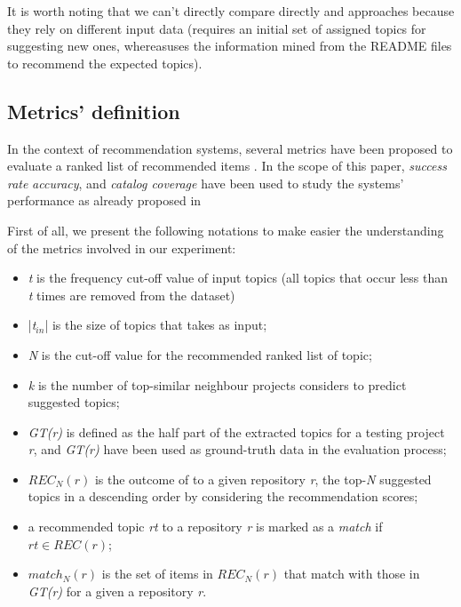It is worth noting that we can't directly compare directly \TF and \MNB approaches because they rely on different input data (\ie \TF requires an initial set of assigned topics for suggesting new ones, whereas\MNB uses the information mined from the README files to recommend the expected topics). 


\subsection{Metrics' definition}\label{sec:metrics}

In the context of recommendation systems, several metrics have been proposed to evaluate a ranked list of recommended items \cite{DBLP:conf/rweb/NoiaO15}. In the scope of this paper, \emph{success rate} \emph{accuracy}, and \emph{catalog coverage} have been used to study the systems' performance as already proposed in \etal~\cite{Robillard:2014:RSS:2631387}

First of all, we present the following notations to make easier the understanding of the metrics involved in our experiment:
\begin{itemize}[noitemsep,topsep=0pt]
	\item \emph{t} is the frequency cut-off value of input topics (\ie all topics that occur less than \emph{t} times are removed from the dataset)
	\item |\emph{t$_{in}$}| is the size of topics that \TF takes as input;
	\item \emph{N} is the cut-off value for the recommended ranked list of topic;%
	\item \emph{k} is the number of top-similar neighbour projects \TF considers to predict suggested topics;
	\item \emph{GT(r)} is defined as the half part of the extracted topics for a testing project \emph{r}, and \emph{GT(r)} have been used as ground-truth data in the evaluation process;
	\item $REC_{N}(r)$ is the outcome of \TF to a given repository \emph{r}, \ie the top-\emph{N}  suggested topics in a descending order by considering the recommendation scores;
	\item a recommended topic \emph{rt} to a repository \emph{r} is marked as a \emph{match} if $rt \in REC(r)$;
	\item  $match_{N}(r)$ is the set of items in $REC_{N}(r)$ that match with those in \emph{GT(r)} for a given a repository \emph{r}.
\end{itemize}



